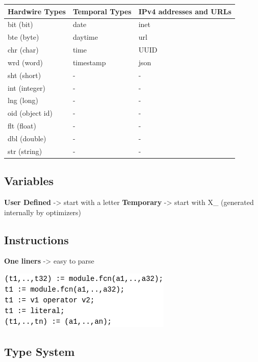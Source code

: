 \documentclass[11pt]{article}
\begin{document}
\begin{center}
\begin{tabular}{lll}
\hline
\textbf{Hardwire Types} & \textbf{Temporal Types} & \textbf{IPv4 addresses and URLs}\\
\hline
bit (bit) & date & inet\\
\hline
bte (byte) & daytime & url\\
\hline
chr (char) & time & UUID\\
\hline
wrd (word) & timestamp & json\\
\hline
sht (short) & - & -\\
\hline
int (integer) & - & -\\
\hline
lng (long) & - & -\\
\hline
oid (object id) & - & -\\
\hline
flt (float) & - & -\\
\hline
dbl (double) & - & -\\
\hline
str (string) & - & -\\
\hline
\end{tabular}
\end{center}

\subsection{Variables}
\label{sec:org676c5db}

\textbf{User Defined} -> start with a letter
\textbf{Temporary}    -> start with X\_ (generated internally by optimizers)

\subsection{Instructions}
\label{sec:org3895fcd}

\textbf{One liners}   -> easy to parse

\begin{center}
\includegraphics[width=.9\linewidth]{./Pictures/instructions-ex.png}
\end{center}

\subsection{Type System}
\label{sec:orgb78fd43}
\end{document}
